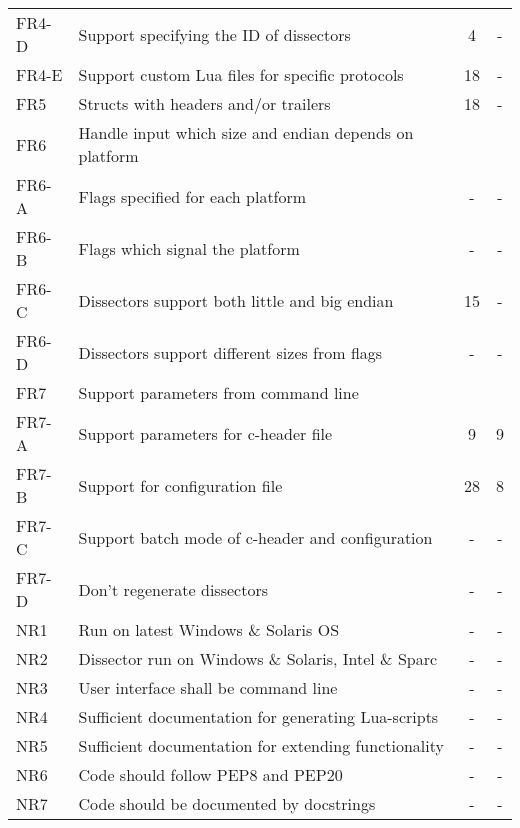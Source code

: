 \begin{table}[ht]
\begin{tabularx}{\textwidth}{l X c c}
	FR4-D & Support specifying the ID of dissectors & 4 & - \\
	FR4-E & Support custom Lua files for specific protocols & 18 & - \\
	\addlinespace
	FR5 & Structs with headers and/or trailers & 18 & - \\
	\addlinespace
	FR6 & Handle input which size and endian depends on platform & & \\
	FR6-A & Flags specified for each platform & - & - \\
	FR6-B & Flags which signal the platform & - & - \\
	FR6-C & Dissectors support both little and big endian & 15 & - \\
	FR6-D & Dissectors support different sizes from flags & - & - \\	
	\addlinespace
	FR7 & Support parameters from command line & & \\
	FR7-A & Support parameters for c-header file & 9 & 9 \\
	FR7-B & Support for configuration file & 28 & 8 \\
	FR7-C & Support batch mode of c-header and configuration & - & - \\
	FR7-D & Don't regenerate dissectors & - & - \\
	\addlinespace
	NR1 & Run on latest Windows \& Solaris OS & - & - \\
	NR2 & Dissector run on Windows \& Solaris, Intel \& Sparc & - & - \\
	NR3 & User interface shall be command line & - & - \\
	NR4 & Sufficient documentation for generating Lua-scripts & - & - \\
	NR5 & Sufficient documentation for extending functionality & - & - \\
	NR6 & Code should follow PEP8 and PEP20 & - & - \\
	NR7 & Code should be documented by docstrings & - & - \\
	\bottomrule
\end{tabularx}
\end{table}

